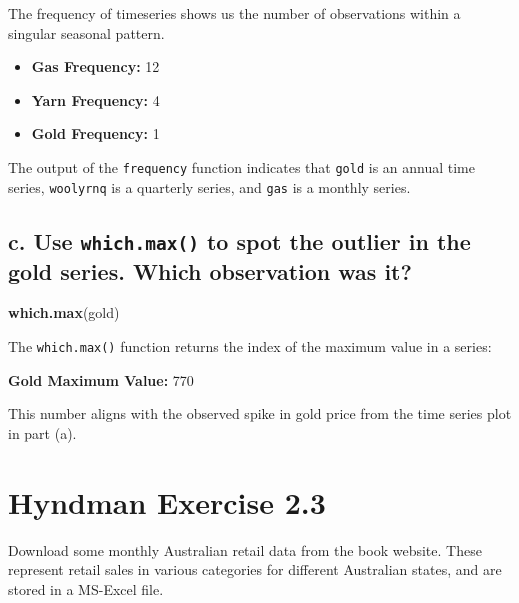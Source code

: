 \documentclass[openany]{book}
\newenvironment{Shaded}{\begin{snugshade}}{\end{snugshade}}
\newcommand{\KeywordTok}[1]{\textcolor[rgb]{0.13,0.29,0.53}{\textbf{#1}}}
\newcommand{\NormalTok}[1]{#1}
\providecommand{\tightlist}{%
  \setlength{\itemsep}{0pt}\setlength{\parskip}{0pt}}
\renewenvironment{quote}{\begin{myquote}}{\end{myquote}}
\begin{document}
The frequency of timeseries shows us the number of observations within a singular seasonal pattern.

\begin{itemize}
\tightlist
\item
  \textbf{Gas Frequency:} 12\\
\item
  \textbf{Yarn Frequency:} 4
\item
  \textbf{Gold Frequency:} 1
\end{itemize}

The output of the \texttt{frequency} function indicates that \texttt{gold} is an annual time series, \texttt{woolyrnq} is a quarterly series, and \texttt{gas} is a monthly series.

\hypertarget{c.-use-which.max-to-spot-the-outlier-in-the-gold-series.-which-observation-was-it}{%
\subsection{\texorpdfstring{c. Use \texttt{which.max()} to spot the outlier in the gold series. Which observation was it?}{c. Use which.max() to spot the outlier in the gold series. Which observation was it?}}\label{c.-use-which.max-to-spot-the-outlier-in-the-gold-series.-which-observation-was-it}}

\begin{Shaded}
\begin{Highlighting}[]
\KeywordTok{which.max}\NormalTok{(gold)}
\end{Highlighting}
\end{Shaded}

The \texttt{which.max()} function returns the index of the maximum value in a series:

\textbf{Gold Maximum Value:} 770

This number aligns with the observed spike in gold price from the time series plot in part (a).

\hypertarget{hyndman-exercise-2.3}{%
\section{Hyndman Exercise 2.3}\label{hyndman-exercise-2.3}}

\begin{quote}
Download some monthly Australian retail data from the book website. These represent retail sales in various categories for different Australian states, and are stored in a MS-Excel file.
\end{quote}
\end{document}

